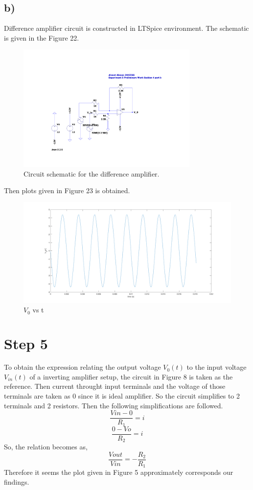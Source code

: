 \documentclass[letterpaper,12pt]{article}
\begin{document}
\subsection{b)}
Difference amplifier circuit is constructed in LTSpice environment. The schematic is given in the Figure 22.
\begin{figure}[H]
	\centering
   \includegraphics[width=0.8\textwidth]{difference_SCH.pdf}
   \caption{Circuit schematic for the difference amplifier.}
\end{figure} 
Then plots given in Figure 23 is obtained.
\begin{figure}[H]
	\centering
   \includegraphics[width=1\textwidth]{4b_vs_t.png}
   \caption{\(V_0\) vs t}
\end{figure}
\section{Step 5}
To obtain the expression relating the output voltage \(V_0 (t)\) to the input voltage \(V_{in} (t)\) of a inverting amplifier setup, the circuit in Figure 8 is taken as the reference. Then current throught input terminals and the voltage of those terminals are taken as 0 since it is ideal amplifier. So the circuit simplifies to 2 terminals and 2 resistors. Then the following simplifications are followed.
\[\frac{V{in} - 0 }{R_1} = i\]
\[\frac{0 - V{o} }{R_2} = i\]
So, the relation becomes as,
\[\frac{V{out}}{V{in}} = -\frac{R_2}{R_1}\]
Therefore it seems the plot given in Figure 5 approximately corresponds our findings.
\end{document}
